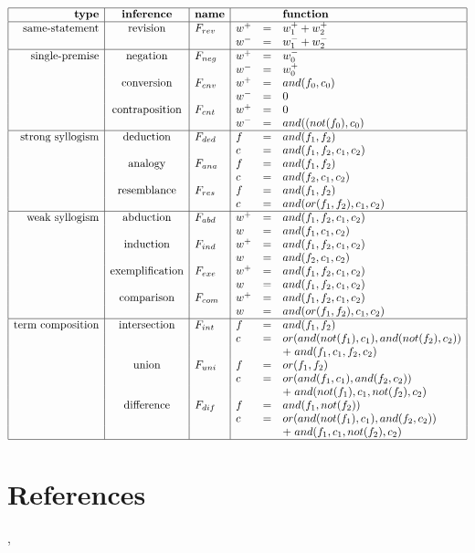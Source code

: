 \begin{table}[hbt]
\[\begin{array}{|r|c|l|lll|}
\hline
\textbf{type} 	& \textbf{inference} 	& \textbf{name}		&&& \textbf{function} \\
\hline
\mbox{same-statement}
& \mbox{revision} & F_{rev} 
& w^+ & = & w^+_1 + w^+_2 \\ &&
& w^- & = & w^-_1 + w^-_2 \\
\hline
\mbox{single-premise}
& \mbox{negation} & F_{neg} 
& w^+ & = & w^-_0 \\ &&
& w^- & = & w^+_0 \\
& \mbox{conversion} & F_{cnv} 
& w^+ & = & and(f_0, c_0) \\ &&
& w^- & = & 0 \\
& \mbox{contraposition} & F_{cnt}
& w^+ & = & 0 \\ &&
& w^- & = & and((not(f_0), c_0) \\
\hline
\mbox{strong syllogism}
& \mbox{deduction} & F_{ded} 
& f & = & and(f_1, f_2) \\ &&
& c & = & and(f_1, f_2, c_1, c_2) \\
& \mbox{analogy} & F_{ana} 
& f & = & and(f_1, f_2) \\ &&
& c & = & and(f_2, c_1, c_2) \\
& \mbox{resemblance} & F_{res} 
& f & = & and(f_1, f_2) \\ &&
& c & = & and(or(f_1, f_2), c_1, c_2) \\
\hline
\mbox{weak syllogism}
& \mbox{abduction} & F_{abd} 
& w^+ & = & and(f_1, f_2, c_1, c_2) \\ &&
& w & = & and(f_1, c_1, c_2) \\ 
& \mbox{induction} & F_{ind} 
& w^+ & = & and(f_1, f_2, c_1, c_2) \\ &&
& w & = & and(f_2, c_1, c_2) \\ 
& \mbox{exemplification} & F_{exe} 
& w^+ & = & and(f_1, f_2, c_1, c_2) \\ &&
& w & = & and(f_1, f_2, c_1, c_2) \\ 
& \mbox{comparison} & F_{com} 
& w^+ & = & and(f_1, f_2, c_1, c_2) \\ &&
& w & = & and(or(f_1, f_2), c_1, c_2) \\
\hline
\mbox{term composition}
& \mbox{intersection} & F_{int}
& f & = & and(f_1, f_2) \\ &&
& c & = & or(and(not(f_1), c_1), and(not(f_2), c_2)) \\ 
&&&&& + \; and(f_1, c_1, f_2, c_2) \\
& \mbox{union} & F_{uni} 
& f & = & or(f_1, f_2) \\ &&
& c & = & or(and(f_1, c_1), and(f_2, c_2))\\
&&&&& + \; and(not(f_1), c_1, not(f_2), c_2) \\
& \mbox{difference} & F_{dif}
& f & = & and(f_1, not(f_2)) \\ &&
& c & = & or(and(not(f_1), c_1), and(f_2, c_2))\\
&&&&& + \; and(f_1, c_1, not(f_2), c_2) \\
\hline \end{array} \]
\caption{The Truth-Value Functions of NAL}
\label{NAL-Functions}
\end{table}

\section*{References}

\cite{wp:book1}, \cite{wp:phd,wp:roadmap}
